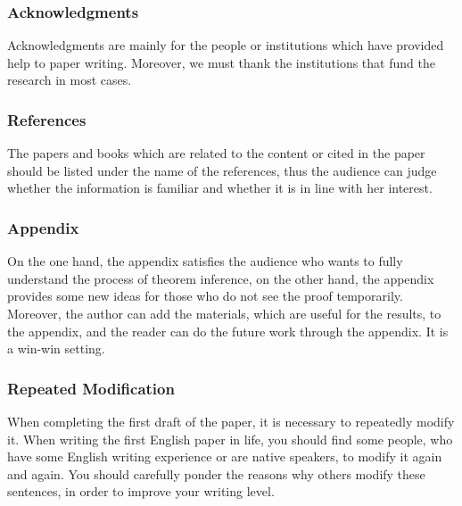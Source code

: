 \subsubsection{Acknowledgments}
Acknowledgments are mainly for the people or institutions which have provided help to paper writing. Moreover, we must thank the institutions that fund the research in most cases.

\subsubsection{References}
The papers and books which are related to the content or cited in the paper should be listed under the name of the references, thus the audience can judge whether the information is familiar and whether it is in line with her interest.

\subsubsection{Appendix}
On the one hand, the appendix satisfies the audience who wants to fully understand the process of theorem inference, on the other hand, the appendix provides some new ideas for those who do not see the proof temporarily. Moreover, the author can add the materials, which are useful for the results, to the appendix, and the reader can do the future work through the appendix. It is a win-win setting.

\subsubsection{Repeated Modification}
When completing the first draft of the paper, it is necessary to repeatedly modify it. When writing the first English paper in life, you should find some people, who have some English writing experience or are native speakers, to modify it again and again. You should carefully ponder the reasons why others modify these sentences, in order to improve your writing level.



\nocite{2013数学之英文写作}

